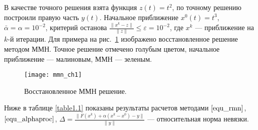  В качестве точного решения взята функция $z(t)=t^2$, по точному решению построили правую часть $y(t)$.  Начальное приближение $x^0(t)=t^3$, $\bar\alpha=\alpha=10^{-2}$, критерий останова $\frac{\|x^k-z\|}{\|z\|}\le\varepsilon=10^{-2}$, где $x^k$ --- приближение на $k$-й итерации. Для примера на рис.~\ref{fig:mmn_ch1} изображено восстановленное решение методом ММН. Точное решение отмечено голубым цветом, начальное приближение --- малиновым, ММН --- зеленым. 
\begin{figure}[h]
	\centering
	\texttt{[image: mmn\_ch1]}
	\caption{Восстановленное ММН решение.}
	\label{fig:mmn_ch1}
\end{figure}
Ниже в таблице \ref{table1.1} показаны результаты расчетов методами $\eqref{equ_rmn}$, $\eqref{equ_alphaproc}$, $\Delta=\frac{\|F(x^k)+\alpha(x^k-x^0)-y\|}{\|y\|}$ --- относительная норма невязки. 
